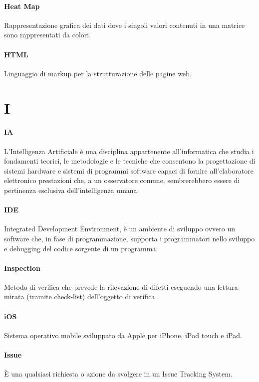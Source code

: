 \documentclass[]{article}
\begin{document}
	\paragraph*{Heat Map}
	Rappresentazione grafica dei dati dove i singoli valori contenuti in una matrice sono rappresentati da colori.
	
	\paragraph*{HTML}
	Linguaggio di markup per la strutturazione delle pagine web.
	
	\newpage
	
	\section*{I}
	
	\paragraph*{IA}
	L'Intelligenza Artificiale è una disciplina appartenente all'informatica che studia i fondamenti teorici, le metodologie e le tecniche che consentono la progettazione di sistemi hardware e sistemi di programmi software capaci di fornire all'elaboratore elettronico prestazioni che, a un osservatore comune, sembrerebbero essere di pertinenza esclusiva dell'intelligenza umana.
	
	\paragraph*{IDE}
	Integrated Development Environment, è un ambiente di sviluppo ovvero un software che, in fase di programmazione, supporta i programmatori nello sviluppo e debugging del codice sorgente di un programma.
	
	\paragraph*{Inspection}
	Metodo di verifica che prevede la rilevazione di difetti eseguendo una lettura mirata (tramite check-list) dell'oggetto di verifica.
	
	\paragraph*{iOS}
	Sistema operativo mobile sviluppato da Apple per iPhone, iPod touch e iPad.
	
	\paragraph*{Issue}
	È una qualsiasi richiesta o azione da svolgere in un Issue Tracking System.
		
\end{document}
